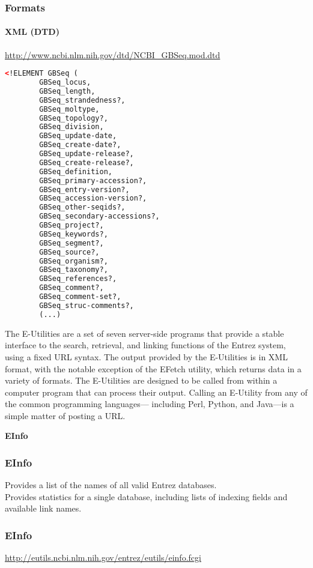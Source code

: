 \documentclass{beamer}
\newcommand{\centeredtitle}[1]{
\begin{center}
    \Huge{\bf{#1}}
\end{center}
}
\newcommand{\hugeslide}[1]{
\begin{frame}
\centeredtitle{#1}
\end{frame}
}
\begin{document}
\begin{frame}[fragile]
\frametitle{Formats}
\framesubtitle{XML (DTD)}
\url{http://www.ncbi.nlm.nih.gov/dtd/NCBI_GBSeq.mod.dtd}
\begin{lstlisting}[language=xml,basicstyle=\tiny,breaklines=false]
<!ELEMENT GBSeq (
        GBSeq_locus, 
        GBSeq_length, 
        GBSeq_strandedness?, 
        GBSeq_moltype, 
        GBSeq_topology?, 
        GBSeq_division, 
        GBSeq_update-date, 
        GBSeq_create-date?, 
        GBSeq_update-release?, 
        GBSeq_create-release?, 
        GBSeq_definition, 
        GBSeq_primary-accession?, 
        GBSeq_entry-version?, 
        GBSeq_accession-version?, 
        GBSeq_other-seqids?, 
        GBSeq_secondary-accessions?, 
        GBSeq_project?, 
        GBSeq_keywords?, 
        GBSeq_segment?, 
        GBSeq_source?, 
        GBSeq_organism?, 
        GBSeq_taxonomy?, 
        GBSeq_references?, 
        GBSeq_comment?, 
        GBSeq_comment-set?, 
        GBSeq_struc-comments?, 
        (...)
\end{lstlisting}
\end{frame}




\begin{frame} 
 The E-Utilities are a set of seven server-side programs that provide a stable interface to the search, retrieval, and linking functions of the Entrez system, using a fixed URL syntax. The output provided by the E-Utilities is in XML format, with the notable exception of the EFetch utility, which returns data in a variety of formats. The E-Utilities are designed to be called from within a computer program that can process their output. Calling an E-Utility from any of the common programming languages— including Perl, Python, and Java—is a simple matter of posting a URL.
\end{frame}


\hugeslide{EInfo}

\begin{frame}[fragile]
\frametitle{EInfo}
Provides a list of the names of all valid Entrez databases.\\
Provides statistics for a single database, including lists of indexing fields and available link names.
\end{frame}

\begin{frame}[fragile]
\frametitle{EInfo}
\small
\url{http://eutils.ncbi.nlm.nih.gov/entrez/eutils/einfo.fcgi}
\end{frame}
\end{document}
